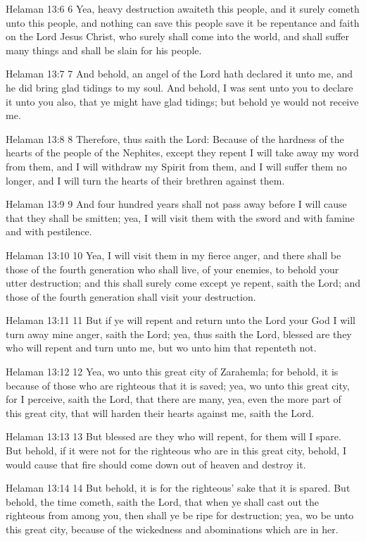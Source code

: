 Helaman 13:6
 6 Yea, heavy destruction awaiteth this people, and it surely
cometh unto this people, and nothing can save this people save it
be repentance and faith on the Lord Jesus Christ, who surely
shall come into the world, and shall suffer many things and shall
be slain for his people.

Helaman 13:7
 7 And behold, an angel of the Lord hath declared it unto me, and
he did bring glad tidings to my soul. And behold, I was sent
unto you to declare it unto you also, that ye might have glad
tidings; but behold ye would not receive me.

Helaman 13:8
 8 Therefore, thus saith the Lord: Because of the hardness of the
hearts of the people of the Nephites, except they repent I will
take away my word from them, and I will withdraw my Spirit from
them, and I will suffer them no longer, and I will turn the
hearts of their brethren against them.

Helaman 13:9
 9 And four hundred years shall not pass away before I will cause
that they shall be smitten; yea, I will visit them with the sword
and with famine and with pestilence.

Helaman 13:10
 10 Yea, I will visit them in my fierce anger, and there shall be
those of the fourth generation who shall live, of your enemies,
to behold your utter destruction; and this shall surely come
except ye repent, saith the Lord; and those of the fourth
generation shall visit your destruction.

Helaman 13:11
 11 But if ye will repent and return unto the Lord your God I
will turn away mine anger, saith the Lord; yea, thus saith the
Lord, blessed are they who will repent and turn unto me, but wo
unto him that repenteth not.

Helaman 13:12
 12 Yea, wo unto this great city of Zarahemla; for behold, it is
because of those who are righteous that it is saved; yea, wo unto
this great city, for I perceive, saith the Lord, that there are
many, yea, even the more part of this great city, that will
harden their hearts against me, saith the Lord.

Helaman 13:13
 13 But blessed are they who will repent, for them will I spare.
But behold, if it were not for the righteous who are in this
great city, behold, I would cause that fire should come down out
of heaven and destroy it.

Helaman 13:14
 14 But behold, it is for the righteous' sake that it is spared.
But behold, the time cometh, saith the Lord, that when ye shall
cast out the righteous from among you, then shall ye be ripe for
destruction; yea, wo be unto this great city, because of the
wickedness and abominations which are in her.

